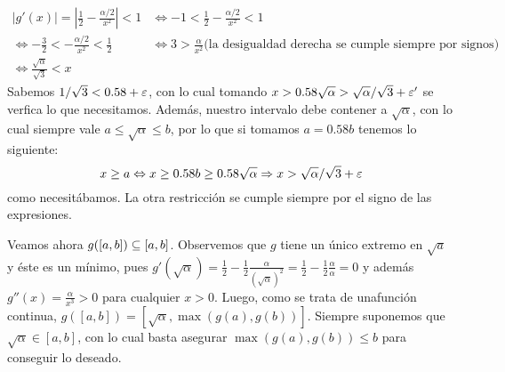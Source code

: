 $\begin{array}{rl}
	 |g'(x)| = |\frac{1}{2} - \frac{\alpha/2}{x^2}|  < 1 & \Leftrightarrow  -1 < \frac{1}{2} - \frac{\alpha/2}{x^2} < 1\nonumber \\
	\Leftrightarrow  -\frac{3}{2} <  - \frac{\alpha/2}{x^2}  < \frac{1}{2} & \Leftrightarrow 
		3 >  \frac{\alpha}{x^2}  \text{(la desigualdad derecha se cumple siempre por signos)} \nonumber \\
	\Leftrightarrow  \frac{\sqrt{\alpha}}{\sqrt{3}} < x \nonumber
\end{array}$\\
Sabemos $1/\sqrt{3} < 0.58 + \varepsilon$, con lo cual tomando $x > 0.58\sqrt{\alpha} > \sqrt{\alpha}/\sqrt{3} + \varepsilon'$ se verfica lo que necesitamos. Además, nuestro intervalo debe contener a $\sqrt{\alpha}$, con lo cual siempre vale $a \leq \sqrt{\alpha} \leq b$, por lo que si tomamos $a = 0.58b$ tenemos lo siguiente:
$$x \geq a \Leftrightarrow x \geq 0.58b \geq 0.58\sqrt{\alpha} \Rightarrow x > \sqrt{\alpha}/\sqrt{3} + \varepsilon$$ 
como necesitábamos. La otra restricción se cumple siempre por el signo de las expresiones.

Veamos ahora $g([a,b]) \subseteq [a,b]$. Observemos que $g$ tiene un único extremo en $\sqrt{a}$ y éste es un mínimo, pues $g'(\sqrt{\alpha}) = \frac{1}{2} - \frac{1}{2}\frac{\alpha}{(\sqrt{\alpha})^2} = \frac{1}{2} - \frac{1}{2}\frac{\alpha}{\alpha} = 0$ y además $g''(x) = \frac{\alpha}{x^3} >0$ para cualquier $x>0$. Luego, como se trata de unafunción continua, $g([a,b]) = [\sqrt{\alpha}, \max(g(a), g(b))]$. Siempre suponemos que $\sqrt{\alpha}\in[a,b]$, con lo cual basta asegurar $\max(g(a), g(b))\leq b$ para conseguir lo deseado.

